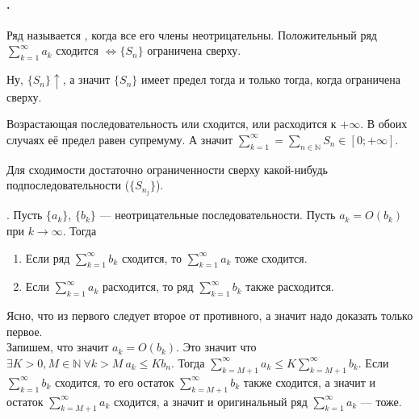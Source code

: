 \documentclass{article}
\begin{document}
    \paragraph{.}
    \begin{itemize}
        \dfn Ряд называется , когда все его члены неотрицательны.
        \thm Положительный ряд $\sum\limits_{k=1}^\infty a_k$ сходится $\Leftrightarrow\{S_n\}$ ограничена сверху.
        \begin{Proof}
            Ну, $\{S_n\}\uparrow$, а значит $\{S_n\}$ имеет предел тогда и только тогда, когда ограничена сверху.
        \end{Proof}
        \begin{Comment}
            Возрастающая последовательность или сходится, или расходится к $+\infty$. В обоих случаях её предел равен супремуму. А значит $\sum\limits_{k=1}^\infty=\sum\limits_{n\in\mathbb N}S_n\in[0;+\infty]$.
        \end{Comment}
        \begin{Comment}
            Для сходимости достаточно ограниченности сверху какой-нибудь подпоследовательности ($\{S_{n_j}\}$).
        \end{Comment}
        \thm {}. Пусть $\{a_k\}$, $\{b_k\}$ --- неотрицательные последовательности. Пусть $a_k=O(b_k)$ при $k\to\infty$. Тогда
        \begin{enumerate}
            \item Если ряд $\sum\limits_{k=1}^\infty b_k$ сходится, то $\sum\limits_{k=1}^\infty a_k$ тоже сходится.
            \item Если $\sum\limits_{k=1}^\infty a_k$ расходится, то ряд $\sum\limits_{k=1}^\infty b_k$ также расходится.
        \end{enumerate}
        \begin{Proof}
            Ясно, что из первого следует второе от противного, а значит надо доказать только первое.\\
            Запишем, что значит $a_k=O(b_k)$. Это значит что $\exists K>0,M\in\mathbb N~\forall k>M~a_k\leqslant Kb_n$. Тогда $\sum\limits_{k=M+1}^\infty a_k\leqslant K\sum\limits_{k=M+1}^\infty b_k$. Если $\sum\limits_{k=1}^\infty b_k$ сходится, то его остаток $\sum\limits_{k=M+1}^\infty b_k$ также сходится, а значит и остаток $\sum\limits_{k=M+1}^\infty a_k$ сходится, а значит и оригинальный ряд $\sum\limits_{k=1}^\infty a_k$ --- тоже.
        \end{Proof}

\end{itemize}
\end{document}
